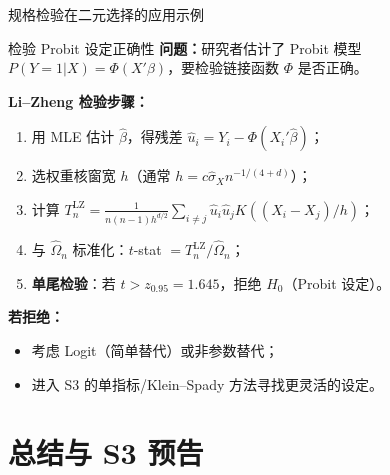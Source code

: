 \documentclass[aspectratio=169, 10pt]{beamer}
\begin{document}
\begin{frame}{规格检验在二元选择的应用示例}

  \begin{examplebox}{检验 Probit 设定正确性}
    \textbf{问题：}研究者估计了 Probit 模型 $P(Y=1|X) = \Phi(X'\beta)$，要检验链接函数 $\Phi$ 是否正确。

    \vspace{0.3em}
    \textbf{Li--Zheng 检验步骤：}
    \begin{enumerate}
      \item 用 MLE 估计 $\hat\beta$，得残差 $\hat u_i = Y_i - \Phi(X_i'\hat\beta)$；
      \item 选权重核窗宽 $h$（通常 $h = c\hat\sigma_X n^{-1/(4+d)}$）；
      \item 计算 $T_n^{\text{LZ}} = \frac{1}{n(n-1)h^{d/2}}\sum_{i\neq j}\hat u_i\hat u_j K((X_i-X_j)/h)$；
      \item 与 $\hat\Omega_n$ 标准化：$t$-stat $= T_n^{\text{LZ}}/\hat\Omega_n$；
      \item \textbf{单尾检验}：若 $t > z_{0.95} = 1.645$，拒绝 $H_0$（Probit 设定）。
    \end{enumerate}

    \vspace{0.3em}
    \textbf{若拒绝：}
    \begin{itemize}
      \item 考虑 Logit（简单替代）或非参数替代；
      \item 进入 S3 的单指标/Klein--Spady 方法寻找更灵活的设定。
    \end{itemize}
  \end{examplebox}

\end{frame}



\section{总结与 S3 预告}
\end{document}
